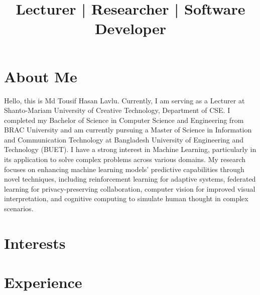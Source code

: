 \documentclass[a4paper,10pt]{article}
\title{Lecturer | Researcher | Software Developer}
\begin{document}
\makecvtitle

\section{About Me}
Hello, this is Md Tousif Hasan Lavlu. Currently, I am serving as a Lecturer at Shanto-Mariam University of Creative Technology, Department of CSE. I completed my Bachelor of Science in Computer Science and Engineering from BRAC University and am currently pursuing a Master of Science in Information and Communication Technology at Bangladesh University of Engineering and Technology (BUET). I have a strong interest in Machine Learning, particularly in its application to solve complex problems across various domains. My research focuses on enhancing machine learning models' predictive capabilities through novel techniques, including reinforcement learning for adaptive systems, federated learning for privacy-preserving collaboration, computer vision for improved visual interpretation, and cognitive computing to simulate human thought in complex scenarios.

\section{Interests}

\section{Experience}
\end{document}
